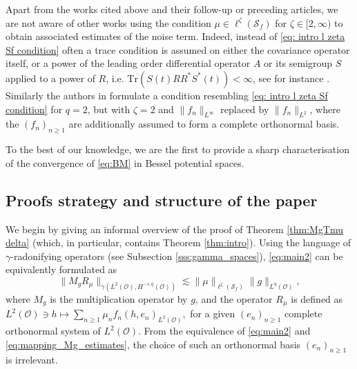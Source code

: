 \documentclass[reqno]{amsart}
\theoremstyle{plain}
\theoremstyle{remark}
\theoremstyle{plain}
\numberwithin{equation}{section}
\newcommand\cO{\mathcal{O}}
\newcommand{\g}{\gamma}
\newcommand{\Tr}{\mathrm{Tr}}
\newcommand{\1}{\one}
\newcommand{\Sf}{\mathcal{S}_{f}}
\begin{document}
    Apart from the works cited above and their follow-up or preceding articles, 
    we are not aware of other works using the condition $\mu\in\ell^\zeta(\Sf)$ for $\zeta\in [2,\infty)$ to obtain associated estimates of the noise term. 
    Indeed, instead of \eqref{eq: intro l zeta Sf condition} often a trace condition is assumed on either the covariance operator itself, or a power of the leading order differential operator $A$ or its semigroup $S$ applied to a  power of $R$, i.e. $\Tr (S(t)RR^*S^*(t))<\infty$, see for instance \cite{hairer2009introduction}.
    Similarly the authors in \cite{blomker2020stochastic} formulate a condition resembling \eqref{eq: intro l zeta Sf condition} for $q=2$, but with $\zeta=2$ and $\|f_n\|_{L^\infty}$ replaced by $\|f_n\|_{L^2}$, where the $(f_n)_{n\geq 1}$ are additionally assumed to form a complete orthonormal basis.

To the best of our knowledge, we are the first to provide a sharp characterisation of the convergence of \eqref{eq:BM} in Bessel potential spaces.


\subsection{Proofs strategy and structure of the paper}
\label{ss:proof_strategy}
We begin by giving an informal overview of the proof of Theorem \ref{thm:MgTmu delta} (which, in particular, contains Theorem \ref{thm:intro}). Using the language of $\g$-radonifying operators (see Subsection \ref{sss:gamma_spaces}), \eqref{eq:main2} can be equivalently formulated as 
\begin{equation}
\label{eq:mapping_Mg_estimates}
\|M_g R_\mu\|_{\g(L^2(\cO),H^{-s,q}(\cO))}\lesssim \|\mu\|_{\ell^\zeta(\Sf)}\|g\|_{L^\eta(\cO)},
\end{equation}
where $M_g$ is the multiplication operator by $g$, and the operator $R_\mu$ is defined as 
$
L^2(\cO) \ni h \mapsto \sum_{n\geq 1} \mu_n f_n (h,e_n)_{L^2(\cO)},
$
for a given $(e_n)_{n\geq 1 }$ complete orthonormal system of $L^2(\cO)$. 
From the equivalence of \eqref{eq:main2} and \eqref{eq:mapping_Mg_estimates}, the choice of such an orthonormal basis $(e_n)_{n\geq 1}$ is irrelevant. 
\end{document}

